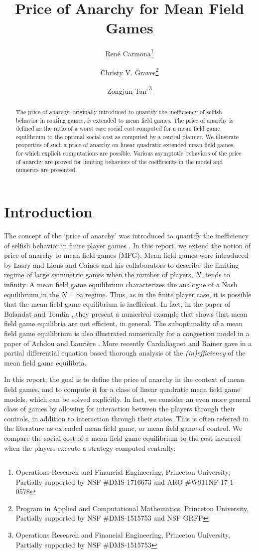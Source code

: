 \documentclass[11pt]{article}
\title{Price of Anarchy for Mean Field Games}
\author{
Ren\'{e} Carmona\thanks{Operations Research and Financial Engineering, Princeton University, Partially supported by NSF \#DMS-1716673 and ARO \#W911NF-17-1-0578} 
\and 
Christy V. Graves\thanks{Program in Applied and Computational Mathematics, Princeton University, Partially supported by NSF \#DMS-1515753 and NSF GRFP}
\and
Zongjun Tan \thanks{Operations Research and Financial Engineering, Princeton University, Partially supported by NSF \#DMS-1515753} 
}
\begin{document}
\maketitle

\begin{abstract}
    The price of anarchy, originally introduced to quantify the inefficiency of selfish behavior in routing games, is extended to mean field games. The price of anarchy is defined as the ratio of a worst case social cost computed for a mean field game equilibrium to the optimal social cost as computed by a central planner. We illustrate properties of such a price of anarchy on linear quadratic extended mean field games, for which explicit computations are possible. Various asymptotic behaviors of the price of anarchy are proved for limiting behaviors of the coefficients in the model and numerics are presented.
\end{abstract}


\section{\textbf{Introduction}} \label{se:introduction}
The concept of the `price of anarchy' was introduced to quantify the inefficiency of selfish behavior in finite player games \cite{christodoulou2005price2}\cite{christodoulou2005price}\cite{koutsoupias1999worst}\cite{Roughgarden}\cite{roughgarden2002bad}\cite{zhu2010price}. In this report, we extend the notion of price of anarchy to mean field games (MFG). Mean field games were introduced by Lasry and Lions \cite{Lasry_Lions} and Caines and his collaborators \cite{Huang} to describe the limiting regime of large symmetric games when the number of players, $N$, tends to infinity. A mean field game equilibrium characterizes the analogue of a Nash equilibrium in the $N=\infty$ regime. Thus, as in the finite player case, it is possible that the mean field game equilibrium is inefficient. In fact, in the paper of Balandat and Tomlin \cite{balandat2013efficiency}, they present a numerical example that shows that mean field game equilibria are not efficient, in general. The suboptimality of a mean field game equilibrium is also illustrated numerically for a congestion model in a paper of Achdou and Lauri\`{e}re \cite{achdou2015system}. More recently Cardaliaguet and Rainer gave in \cite{pierre_poa} a partial differential equation based thorough analysis of the \emph{(in)efficiency} of the mean field game equilibria.

In this report, the goal is to define the price of anarchy in the context of mean field games, and to compute it for a class of linear quadratic mean field game models, which can be solved explicitly. In fact, we consider an even more general class of games by allowing for interaction between the players through their controls, in addition to interaction through their states. This is often referred in the literature as extended mean field game, or mean field game of control. We compare the social cost of a mean field game equilibrium to the cost incurred when the players execute a strategy computed centrally.
\end{document}
